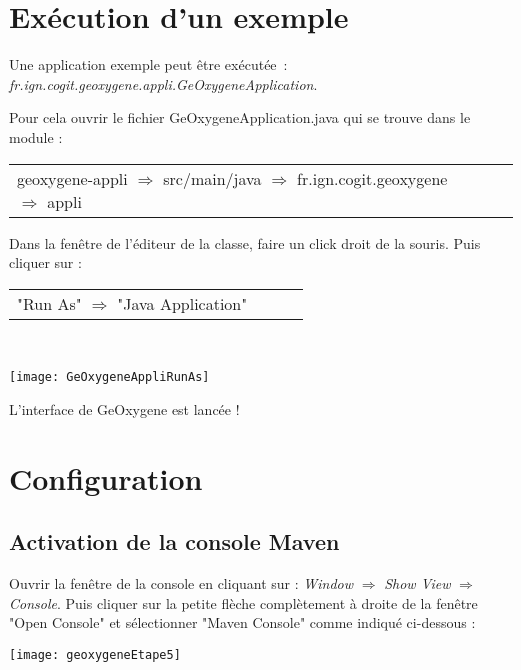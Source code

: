 \section{Exécution d'un exemple}
Une application exemple peut \^etre exécutée~: \emph{fr.ign.cogit.geoxygene.appli.GeOxygeneApplication}.

\bigskip

\noindent
Pour cela ouvrir le fichier GeOxygeneApplication.java qui se trouve dans le module : \\
\begin{tabular}[!t]{llll}
   geoxygene-appli $\Rightarrow$ src/main/java $\Rightarrow$  fr.ign.cogit.geoxygene $\Rightarrow$ appli
\end{tabular}

\bigskip

\noindent
Dans la fenêtre de l'éditeur de la classe, faire un click droit de la souris. Puis cliquer sur :\\
\begin{tabular}[!t]{llll}
"Run As" $\Rightarrow$ "Java Application"
\end{tabular}\\

\begin{center}
\texttt{[image: GeOxygeneAppliRunAs]}
\end{center}

L'interface de GeOxygene est lancée !


\section{Configuration}


\subsection{Activation de la console Maven}

Ouvrir la fenêtre de la console en cliquant sur : {\emph{Window} $\Rightarrow$ \emph{Show View}  $\Rightarrow$ \emph{Console}}. Puis cliquer sur la petite flèche complètement à droite de la fenêtre "Open Console" et sélectionner "Maven Console" comme indiqué ci-dessous :

\begin{center}
\texttt{[image: geoxygeneEtape5]}
\end{center}


